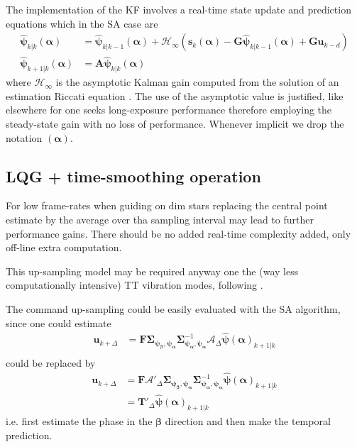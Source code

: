 \documentclass[a4paper,12pt]{article}
\newcommand{\0}{\mathsf{0}} %
\newcommand{\CovMat}{\boldsymbol{\Sigma}} %
\newcommand{\D}{\mathbf{G}} %
\newcommand{\alphavec}{{\boldsymbol{\alpha}}}
\newcommand{\betavec}{{\boldsymbol{\beta}}}
\newcommand{\phivec}{{\boldsymbol{\psi}}}
\newcommand{\svec}{{\mathbf{s}}}
\newcommand{\uvec}{{\mathbf{u}}}
\newcommand{\Asa}{{\mathbf{A}}}
\begin{document}
The implementation of the KF involves a real-time state update and prediction equations which in the SA case are
\begin{subequations}\label{eq:single_rate_StatSA_RToperations}
\begin{align}
  \widehat{\phivec}_{k|k}(\alphavec) & = \widehat{\phivec}_{k|k-1}(\alphavec) + \mathcal{H}_\infty\left(\svec_k(\alphavec) -
     \D \widehat{\phivec}_{k|k-1}(\alphavec) +  \D \uvec_{k-d}\right) 
\\
  \widehat{\phivec}_{k+1|k}(\alphavec) & = \Asa\widehat{\phivec}_{k|k} (\alphavec)
\end{align}
\end{subequations}
where $\mathcal{H}_\infty$ is the asymptotic Kalman gain computed from the solution of an estimation Riccati equation \cite{correia10a}. The use of the asymptotic value is justified, like elsewhere \cite{petit08} for one seeks long-exposure performance therefore employing the steady-state gain with no loss of performance. Whenever implicit we drop the notation $(\alphavec)$.


\subsection{LQG + time-smoothing operation}


For low frame-rates when guiding on dim stars replacing the central point estimate by the average over tha sampling interval may lead to further performance gains. There should be no added real-time complexity added, only off-line extra computation. 

This up-sampling model may be required anyway one the (way less computationally intensive) TT vibration modes, following \cite{correia12}.


The command up-sampling could be easily evaluated with the SA algorithm, since one could estimate 
\begin{align}
  \uvec_{k+\Delta} & = \mathbf{F} \CovMat_{\phivec_\betavec,\phivec_\alphavec}\CovMat_{\phivec_\alphavec,\phivec_\alphavec}^{-1} \mathcal{A}_\Delta\widehat{\phivec}(\alphavec)_{ k+1|k}\\
\end{align}
could be replaced by 
\begin{align}
  \uvec_{k+\Delta} & = \mathbf{F} \mathcal{A}'_\Delta\CovMat_{\phivec_\betavec,\phivec_\alphavec}\CovMat_{\phivec_\alphavec,\phivec_\alphavec}^{-1} \widehat{\phivec}(\alphavec)_{ k+1|k}\\
& = \mathbf{T}'_\Delta\widehat{\phivec}(\alphavec)_{ k+1|k}
\end{align}
i.e. first estimate the phase in the $\betavec$ direction and then make the temporal prediction. 
\end{document}

